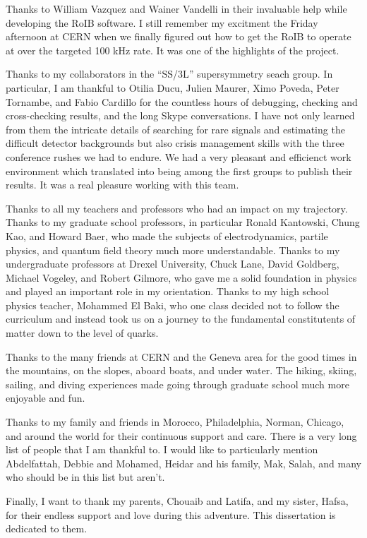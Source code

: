 Thanks to William Vazquez and Wainer Vandelli in their invaluable help while developing the RoIB software.
I still remember my excitment the Friday afternoon at CERN when we finally figured out how to get the RoIB to operate at 
over the targeted 100 kHz rate. It was one of the highlights of the project.

Thanks to my collaborators in the ``SS/3L'' supersymmetry seach group. In particular, I am thankful to 
Otilia Ducu, Julien Maurer, Ximo Poveda, Peter Tornambe, and Fabio Cardillo for the countless hours of debugging, 
checking and cross-checking results, and the long Skype conversations. 
I have not only learned from them the intricate details of searching for rare signals and estimating 
the difficult detector backgrounds but also crisis management skills with the three conference rushes we had to endure. 
We had a very pleasant and efficienct work environment which translated into being among the first groups to 
publish their results.
It was a real pleasure working with this team.

Thanks to all my teachers and professors who had an impact on my trajectory.
Thanks to my graduate school professors, 
in particular Ronald Kantowski, Chung Kao, and Howard Baer, who made the subjects of 
electrodynamics, partile physics, and quantum field theory much more understandable.
Thanks to my undergraduate professors at Drexel University,
Chuck Lane, David Goldberg, Michael Vogeley, and Robert Gilmore, who gave me a solid foundation
in physics and played an important role in my orientation.
Thanks to my high school physics teacher, Mohammed El Baki, who one class decided not to follow
the curriculum and instead took us on a journey to the fundamental constitutents of matter 
down to the level of quarks. 

Thanks to the many friends at CERN and the Geneva area for the good times in the mountains, on the slopes, aboard boats, 
and under water. The hiking, skiing, sailing, and diving experiences made going through graduate school much more enjoyable and fun.

Thanks to my family and friends in Morocco, Philadelphia, Norman, Chicago, and around the world for their continuous support and care. 
There is a very long list of people that I am thankful to. I would like to particularly mention Abdelfattah, Debbie and Mohamed, 
Heidar and his family, Mak, Salah, and many who should be in this list but aren't. 

Finally, I want to thank my parents, Chouaib and Latifa, and my sister, Hafsa, for their  
endless support and love during this adventure. This dissertation is dedicated to them.






